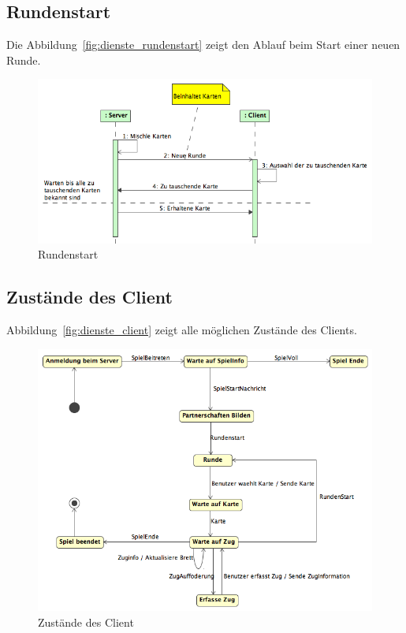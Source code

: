 \documentclass[12pt,halfparskip]{scrartcl}
\begin{document}
\subsection{Rundenstart} %
\label{sub:rundenstart}
Die Abbildung~\vref{fig:dienste_rundenstart} zeigt den Ablauf beim Start einer neuen Runde.
\begin{figure}[h]
	\centering
	\includegraphics[width=\textwidth]{dienste_rundenstart}
	\caption{Rundenstart}
	\label{fig:dienste_rundenstart}
\end{figure}

\subsection{Zustände des Client} %
\label{sub:zustände_des_client}
Abbildung~\vref{fig:dienste_client} zeigt alle möglichen Zustände des Clients.
\begin{figure}[h]
	\centering
	\includegraphics[width=0.8 \textwidth]{dienste_client}
	\caption{Zustände des Client}
	\label{fig:dienste_client}
\end{figure}
\end{document}
